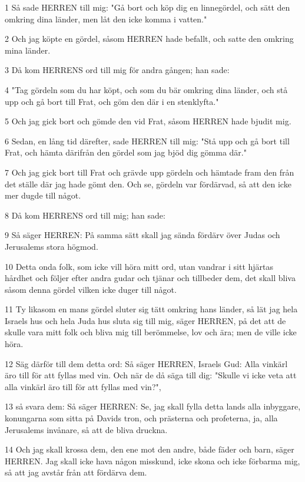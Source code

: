 \par 1 Så sade HERREN till mig: "Gå bort och köp dig en linnegördel, och sätt den omkring dina länder, men låt den icke komma i vatten."
\par 2 Och jag köpte en gördel, såsom HERREN hade befallt, och satte den omkring mina länder.
\par 3 Då kom HERRENS ord till mig för andra gången; han sade:
\par 4 "Tag gördeln som du har köpt, och som du bär omkring dina länder, och stå upp och gå bort till Frat, och göm den där i en stenklyfta."
\par 5 Och jag gick bort och gömde den vid Frat, såsom HERREN hade bjudit mig.
\par 6 Sedan, en lång tid därefter, sade HERREN till mig: "Stå upp och gå bort till Frat, och hämta därifrån den gördel som jag bjöd dig gömma där."
\par 7 Och jag gick bort till Frat och grävde upp gördeln och hämtade fram den från det ställe där jag hade gömt den. Och se, gördeln var fördärvad, så att den icke mer dugde till något.
\par 8 Då kom HERRENS ord till mig; han sade:
\par 9 Så säger HERREN: På samma sätt skall jag sända fördärv över Judas och Jerusalems stora högmod.
\par 10 Detta onda folk, som icke vill höra mitt ord, utan vandrar i sitt hjärtas hårdhet och följer efter andra gudar och tjänar och tillbeder dem, det skall bliva såsom denna gördel vilken icke duger till något.
\par 11 Ty likasom en mans gördel sluter sig tätt omkring hans länder, så lät jag hela Israels hus och hela Juda hus sluta sig till mig, säger HERREN, på det att de skulle vara mitt folk och bliva mig till berömmelse, lov och ära; men de ville icke höra.
\par 12 Säg därför till dem detta ord: Så säger HERREN, Israels Gud: Alla vinkärl äro till för att fyllas med vin. Och när de då säga till dig: "Skulle vi icke veta att alla vinkärl äro till för att fyllas med vin?",
\par 13 så svara dem: Så säger HERREN: Se, jag skall fylla detta lands alla inbyggare, konungarna som sitta på Davids tron, och prästerna och profeterna, ja, alla Jerusalems invånare, så att de bliva druckna.
\par 14 Och jag skall krossa dem, den ene mot den andre, både fäder och barn, säger HERREN. Jag skall icke hava någon misskund, icke skona och icke förbarma mig, så att jag avstår från att fördärva dem.
